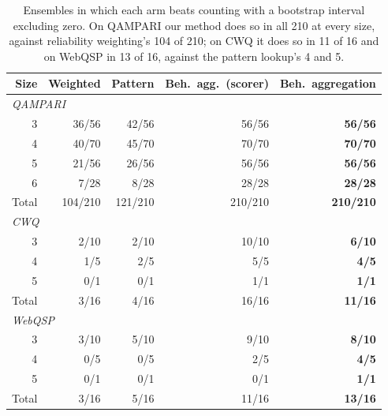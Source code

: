 \documentclass[11pt]{article}
\begin{document}
\begin{table}[t]
  \caption{Ensembles in which each arm beats counting with a bootstrap interval excluding zero. On QAMPARI our method does so in all 210 at every size, against reliability weighting's 104 of 210; on CWQ it does so in 11 of 16 and on WebQSP in 13 of 16, against the pattern lookup's 4 and 5.}
  \label{tab:ens-sig}
  \centering
  \begin{tabular}{rrrrr}
    \toprule
    Size & Weighted & Pattern & Beh.\ agg.\ (scorer) & Beh.\ aggregation \\
    \midrule
    \multicolumn{5}{l}{\emph{QAMPARI}} \\
    3 & 36/56 & 42/56 & 56/56 & \textbf{56/56} \\
    4 & 40/70 & 45/70 & 70/70 & \textbf{70/70} \\
    5 & 21/56 & 26/56 & 56/56 & \textbf{56/56} \\
    6 &  7/28 &  8/28 & 28/28 & \textbf{28/28} \\
    \midrule
    Total & 104/210 & 121/210 & 210/210 & \textbf{210/210} \\
    \midrule
    \multicolumn{5}{l}{\emph{CWQ}} \\
    3 & 2/10 & 2/10 & 10/10 & \textbf{6/10} \\
    4 & 1/5  & 2/5  & 5/5   & \textbf{4/5}  \\
    5 & 0/1  & 0/1  & 1/1   & \textbf{1/1}  \\
    \midrule
    Total & 3/16 & 4/16 & 16/16 & \textbf{11/16} \\
    \midrule
    \multicolumn{5}{l}{\emph{WebQSP}} \\
    3 & 3/10 & 5/10 & 9/10 & \textbf{8/10} \\
    4 & 0/5  & 0/5  & 2/5  & \textbf{4/5}  \\
    5 & 0/1  & 0/1  & 0/1  & \textbf{1/1}  \\
    \midrule
    Total & 3/16 & 5/16 & 11/16 & \textbf{13/16} \\
    \bottomrule
  \end{tabular}
\end{table}
\end{document}
